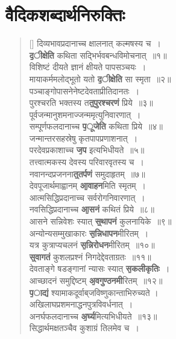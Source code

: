 \documentclass[twoside,12pt,notitlepage]{book}
\begin{document}
\section{वैदिकशब्दार्थनिरुक्तिः}
\begin{verse}[\versewidth]
दिव्यभावप्रदानाच्च क्षालनात् कल्मषस्य च~। \\[-6pt]
\textbf{\b दीक्षेति} कथिता सद्भिर्भवबन्धविमोचनात्~॥१॥\\[-6pt]
विशिष्टं दीयते ज्ञानं क्षीयते पापसञ्चयः~।\\[-6pt]
मायाकर्ममलोद्भूतो यतो \textbf{\b दीक्षेति} सा स्मृता~॥२॥\\
पञ्चाङ्गोपासनेनेष्टदेवताप्रीतिदानतः~।\\[-6pt]
पुरश्चरति भक्तस्य त\textbf{\b त्पुरश्चरणं} प्रिये~॥३॥\\
पूर्वजन्मानुशमनाज्जन्ममृत्युनिवारणात्~।\\[-6pt]
सम्पूर्णफलदानाच्च \textbf{\b पूजेति} कथिता प्रिये~॥४॥\\
जन्मान्तरसहस्रेषु कृतपापप्रणाशनात्~।\\[-6pt]
परदेवप्रकाशाच्च \textbf{\b जप} इत्यभिधीयते~॥५॥\\
तत्त्वात्मकस्य देवस्य परिवारवृतस्य च~।\\[-6pt]
नवानन्दप्रजनना\textbf{\b त्तर्पणं} समुदाहृतम्~॥७॥\\
देवपूजार्थमाह्वानम् \textbf{\b आवाहन}मिति स्मृतम्~।\\[-6pt]
आत्मसिद्धिप्रदानाच्च सर्वरोगनिवारणात्~।\\[-6pt]
नवसिद्धिप्रदानाच्च  \textbf{\b आसनं} कथितं प्रिये~॥८॥\\
आसने सन्निवेशः स्यात् \textbf{\b स्थापनं} कुलनायिके~॥९॥\\
अन्योन्यसम्मुखाकारः \textbf{\b सन्निधापन}मीरितम्~।\\[-6pt]
यत्र कुत्राप्यचलनं  \textbf{\b सन्निरोधन}मीरितम्~॥१०॥\\
\textbf{\b स्वागतं} कुशलप्रश्नं निगदेद्देवताग्रतः~॥११॥\\
देवताङ्गे षडङ्गानां न्यासः स्यात् \textbf{\b सकलीकृतिः}~।\\[-6pt]
आच्छादनं समुद्दिष्टम् \textbf{\b अवगुण्ठनमी}रितम्~॥१२॥\\
\textbf{\b पाद्यं} श्यामाकदूर्वाब्‌जविष्णुकान्ताभिरुच्यते ।\\[-6pt]
अखिलाघप्रशमनाद्धनपुत्रविवर्धनात्~।\\[-6pt]
अनर्घफलदानाच्च \textbf{\b अर्घ्य}मित्यभिधीयते~॥१३॥\\
सिद्धार्थमक्षतञ्चैव कुशाग्रं तिलमेव च~।\\[-6pt]

\end{verse}
\end{document}
